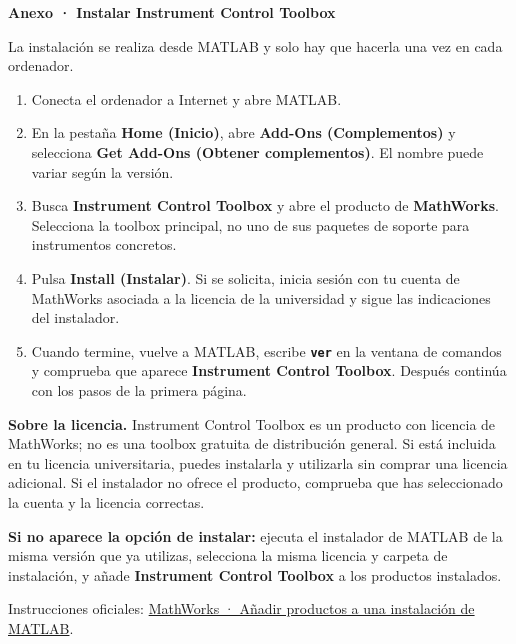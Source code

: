 \documentclass[11pt,a4paper]{article}
\begin{document}
\clearpage
{\LARGE\bfseries\color{isa} Anexo · Instalar Instrument Control Toolbox}\par
\medskip
La instalación se realiza desde MATLAB y solo hay que hacerla una vez en cada ordenador.

\begin{enumerate}
\item Conecta el ordenador a Internet y abre MATLAB.
\item En la pestaña \textbf{Home (Inicio)}, abre \textbf{Add-Ons (Complementos)} y selecciona \textbf{Get Add-Ons (Obtener complementos)}. El nombre puede variar según la versión.
\item Busca \textbf{Instrument Control Toolbox} y abre el producto de \textbf{MathWorks}. Selecciona la toolbox principal, no uno de sus paquetes de soporte para instrumentos concretos.
\item Pulsa \textbf{Install (Instalar)}. Si se solicita, inicia sesión con tu cuenta de MathWorks asociada a la licencia de la universidad y sigue las indicaciones del instalador.
\item Cuando termine, vuelve a MATLAB, escribe \textbf{\texttt{ver}} en la ventana de comandos y comprueba que aparece \textbf{Instrument Control Toolbox}. Después continúa con los pasos de la primera página.
\end{enumerate}

\textbf{Sobre la licencia.} Instrument Control Toolbox es un producto con licencia de MathWorks; no es una toolbox gratuita de distribución general. Si está incluida en tu licencia universitaria, puedes instalarla y utilizarla sin comprar una licencia adicional. Si el instalador no ofrece el producto, comprueba que has seleccionado la cuenta y la licencia correctas.

\textbf{Si no aparece la opción de instalar:} ejecuta el instalador de MATLAB de la misma versión que ya utilizas, selecciona la misma licencia y carpeta de instalación, y añade \textbf{Instrument Control Toolbox} a los productos instalados.

\smallskip
{\small Instrucciones oficiales: \href{https://www.mathworks.com/help/install/ug/add-to-existing-installation.html}{MathWorks · Añadir productos a una instalación de MATLAB}.}
\end{document}
